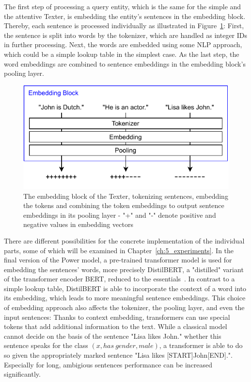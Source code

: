 The first step of processing a query entity, which is the same for the simple and the attentive Texter, is embedding the entity's sentences in the embedding block. Thereby, each sentence is processed individually as illustrated in Figure~\ref{fig:4_approach/1_texter/1_text_embedding/embedding_block}: First, the sentence is split into words by the tokenizer, which are handled as integer IDs in further processing. Next, the words are embedded using some NLP approach, which could be a simple lookup table in the simplest case. As the last step, the word embeddings are combined to sentence embeddings in the embedding block's pooling layer.

\begin{figure}[t]
    \centering
    \includegraphics{4_approach/1_texter/1_text_embedding/embedding_block}
    \caption{The embedding block of the Texter, tokenizing sentences, embedding the tokens and combining the token embeddings to output sentence embeddings in its pooling layer - "+" and "-" denote positive and negative values in embedding vectors}
    \label{fig:4_approach/1_texter/1_text_embedding/embedding_block}
\end{figure}

There are different possibilities for the concrete implementation of the individual parts, some of which will be examined in Chapter~\ref{ch:5_experiments}. In the final version of the Power model, a pre-trained transformer model is used for embedding the sentences' words, more precisely DistilBERT, a "distilled" variant of the transformer encoder BERT, reduced to the essentials~\cite{Sanh2019DistilBERTAD}. In contrast to a simple lookup table, DistilBERT is able to incorporate the context of a word into its embedding, which leads to more meaningful sentence embeddings. This choice of embedding approach also affects the tokenizer, the pooling layer, and even the input sentences: Thanks to context embedding, transformers can use special tokens that add additional information to the text. While a classical model cannot decide on the basis of the sentence "Lisa likes John." whether this sentence speaks for the class $(x, has~gender, male)$, a transformer is able to do so given the appropriately marked sentence "Lisa likes [START]John[END].". Especially for long, ambigious sentences performance can be increased significantly.

